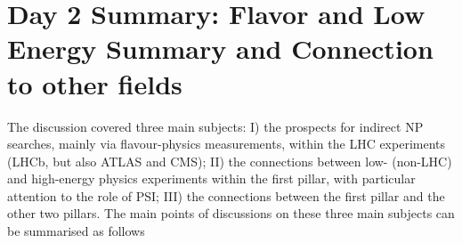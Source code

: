 \section{Day 2 Summary: Flavor and Low Energy Summary and Connection to other 
fields}\label{discussionconnetion}




The discussion covered three main subjects: I) the prospects for indirect NP searches, mainly via flavour-physics 
measurements, within the LHC experiments (LHCb, but also ATLAS and CMS);
II) the connections between low- (non-LHC) and high-energy physics experiments within the first pillar, with particular attention to the role of PSI;
III) the connections between the first pillar and the other two pillars.
The main points of discussions on these three main subjects can be summarised as follows

